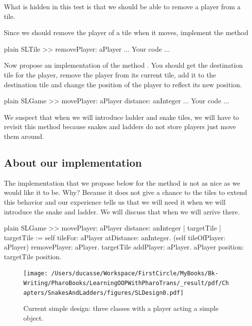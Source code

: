 \documentclass[10pt,twoside,english]{_support/latex/sbabook/sbabook}
\begin{document}
What is hidden in this test is that we should be able to remove a player from a tile.

Since we should remove the player of a tile when it moves, implement the method

\begin{displaycode}{plain}
SLTile >> removePlayer: aPlayer
	... Your code ...
\end{displaycode}

Now propose an implementation of the method .
You should get the destination tile for the player, remove the player from its current tile, add it to the destination tile and change the position of the player to reflect its new position.

\begin{displaycode}{plain}
SLGame >> movePlayer: aPlayer distance: anInteger
	... Your code ...
\end{displaycode}

We suspect that when we will introduce ladder and snake tiles, we will have to revisit this method because snakes and ladders do not store players just move them around.
\subsection{About our implementation}
The implementation  that we propose below for the  method  is not as nice as we would like it to be. Why? Because it does not give a chance to the tiles to extend this behavior and our experience tells us that we will need it when we will introduce the snake and ladder. We will discuss that when we will arrive there. 

\begin{displaycode}{plain}
SLGame >> movePlayer: aPlayer distance: anInteger 
	| targetTile |
	targetTile := self tileFor: aPlayer atDistance: anInteger.
	(self tileOfPlayer: aPlayer) removePlayer: aPlayer.
	targetTile addPlayer: aPlayer.
	aPlayer position: targetTile position.
\end{displaycode}


\begin{figure}

\begin{center}
\texttt{[image: /Users/ducasse/Workspace/FirstCircle/MyBooks/Bk-Writing/PharoBooks/LearningOOPWithPharoTrans/\_result/pdf/Chapters/SnakesAndLadders/figures/SLDesign0.pdf]}\caption{Current simple design: three classes with a player acting a simple object.\label{fig:sldesign0}}\end{center}
\end{figure}
\end{document}
